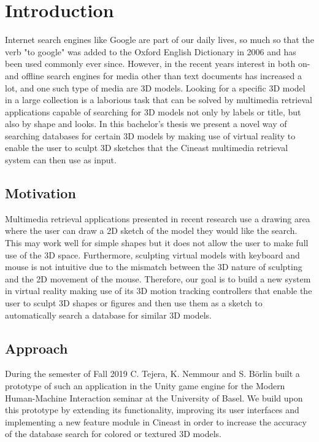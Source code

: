 \chapter{Introduction}

Internet search engines like Google are part of our daily lives, so much so that the verb "to google" was added to the Oxford English Dictionary in 2006 and has been used commonly ever since. However, in the recent years interest in 
both on- and offline search engines for media other than text documents has increased a lot, and one such type of media are 3D models. Looking for a specific 3D model in a large collection is a laborious task that can be solved by multimedia retrieval applications capable of searching for 3D models not only by labels or title, but also by shape and looks. In this bachelor's thesis we present a novel way of searching databases for certain 3D models by making use of virtual reality to enable the user to sculpt 3D sketches that the Cineast multimedia retrieval system can then use as input.

\section{Motivation}

Multimedia retrieval applications presented in recent research use a drawing area where the user can draw a 2D sketch of the model they would like the search. This may work well for simple shapes but it does not allow the user to make full use of the 3D space. Furthermore, sculpting virtual models with keyboard and mouse is not intuitive due to the mismatch between the 3D nature of sculpting and the 2D movement of the mouse. Therefore, our goal is to build a new system in virtual reality making use of its 3D motion tracking controllers that enable the user to sculpt 3D shapes or figures and then use them as a sketch to automatically search a database for similar 3D models.

\section{Approach}
\label{sec:approach}

During the semester of Fall 2019 C. Tejera, K. Nemmour and S. Börlin built a prototype of such an application in the Unity game engine for the Modern Human-Machine Interaction seminar at the University of Basel.
We build upon this prototype by extending its functionality, improving its user interfaces and implementing a new feature module in Cineast in order to increase the accuracy of the database search for colored or textured 3D models.